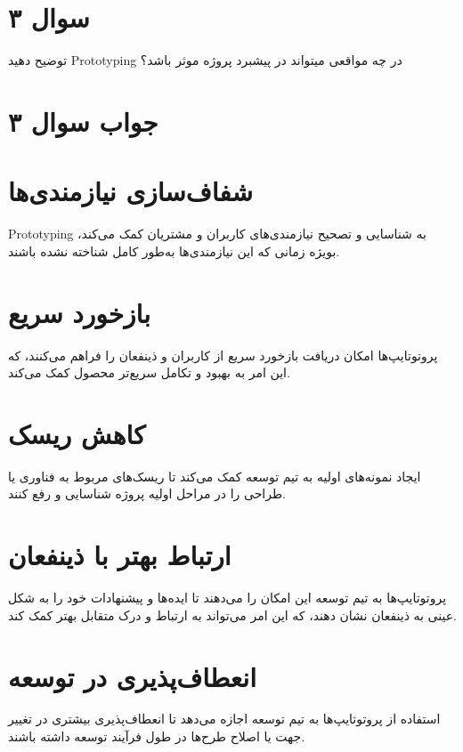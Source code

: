 \section*{سوال ۳}

توضیح دهید Prototyping در چه مواقعی میتواند در پیشبرد پروژه موثر باشد؟

\section*{جواب سوال ۳}

\section*{شفاف‌سازی نیازمندی‌ها}
Prototyping به شناسایی و تصحیح نیازمندی‌های کاربران و مشتریان کمک می‌کند، بویژه زمانی که این نیازمندی‌ها به‌طور کامل شناخته نشده باشند.

\section*{بازخورد سریع}
پروتوتایپ‌ها امکان دریافت بازخورد سریع از کاربران و ذینفعان را فراهم می‌کنند، که این امر به بهبود و تکامل سریع‌تر محصول کمک می‌کند.

\section*{کاهش ریسک}
ایجاد نمونه‌های اولیه به تیم توسعه کمک می‌کند تا ریسک‌های مربوط به فناوری یا طراحی را در مراحل اولیه پروژه شناسایی و رفع کنند.

\section*{ارتباط بهتر با ذینفعان}
پروتوتایپ‌ها به تیم توسعه این امکان را می‌دهند تا ایده‌ها و پیشنهادات خود را به شکل عینی به ذینفعان نشان دهند، که این امر می‌تواند به ارتباط و درک متقابل بهتر کمک کند.

\section*{انعطاف‌پذیری در توسعه}
استفاده از پروتوتایپ‌ها به تیم توسعه اجازه می‌دهد تا انعطاف‌پذیری بیشتری در تغییر جهت یا اصلاح طرح‌ها در طول فرآیند توسعه داشته باشند.
